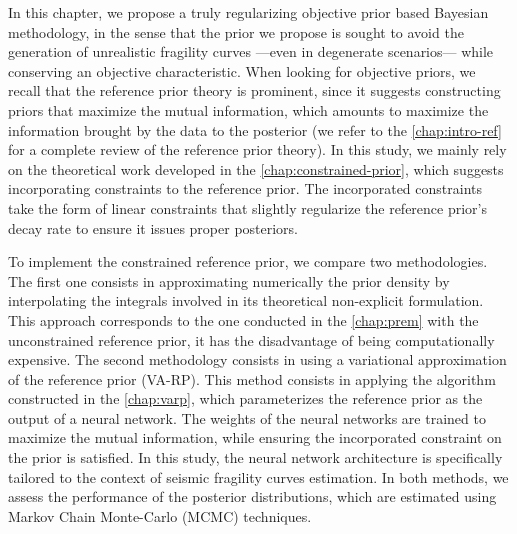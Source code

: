 




In this chapter, we propose a truly regularizing objective prior based Bayesian methodology, in the sense that the prior we propose is sought to avoid the generation of unrealistic fragility curves ---even in degenerate scenarios--- while conserving an objective characteristic.
When looking for objective priors, we recall that the reference prior theory is prominent, since it suggests constructing priors that maximize the mutual information,  which amounts to maximize the information brought by the data to the posterior (we refer to the \cref{chap:intro-ref} for a complete review of the reference prior theory).
In this study, we
mainly rely on the theoretical work developed in the \cref{chap:constrained-prior}, which suggests incorporating constraints to the reference prior. %
The incorporated constraints %
take the form of linear constraints that slightly regularize the reference prior's decay rate to ensure it issues proper posteriors.


To implement the constrained reference prior, we compare two methodologies.
The first one consists in approximating numerically the prior density by interpolating the integrals involved in its theoretical non-explicit formulation. %
This approach corresponds to the one conducted in the \cref{chap:prem} with the unconstrained reference prior, it has the disadvantage of being computationally expensive.
The second methodology consists in using a variational approximation of the reference prior (VA-RP).
This method consists in applying the algorithm constructed in the \cref{chap:varp}, which parameterizes the reference prior as the output of a neural network.
The weights of the neural networks are trained to maximize the mutual information, while ensuring the incorporated constraint on the prior is satisfied.
In this study, the neural network architecture is specifically tailored to the context of seismic fragility curves estimation.
In both methods, we assess the performance of the posterior distributions, which are estimated using Markov Chain Monte-Carlo (MCMC) techniques.



